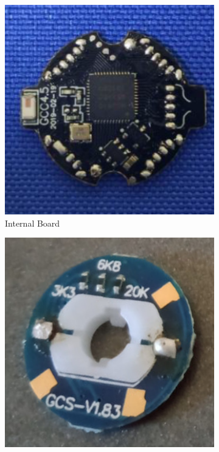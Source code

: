 \begin{figure}[h]
    \centering
    \begin{subfigure}{0.25\textwidth}
        \centering
        \includegraphics[width=.90\linewidth]{Figures/3 State of the Art/giiker-internal-board.png}
        \caption{Internal Board \cite{giiker-internals}}
        \label{fig:giiker-internal-board}
    \end{subfigure}%
    \begin{subfigure}{0.25\textwidth}
        \centering
        \includegraphics[width=.90\linewidth]{Figures/3 State of the Art/giiker-center-front.png}

\end{subfigure}
\end{figure}
